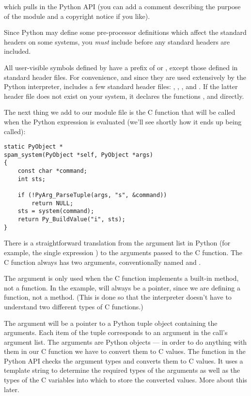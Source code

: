 which pulls in the Python API (you can add a comment describing the
purpose of the module and a copyright notice if you like).

\begin{notice}[warning]
  Since Python may define some pre-processor definitions which affect
  the standard headers on some systems, you \emph{must} include
   before any standard headers are included.
\end{notice}

All user-visible symbols defined by  have a prefix of
 or , except those defined in standard header files.
For convenience, and since they are used extensively by the Python
interpreter,  includes a few standard header files:
, , , and
.  If the latter header file does not exist on your
system, it declares the functions ,
 and  directly.

The next thing we add to our module file is the C function that will
be called when the Python expression 
is evaluated (we'll see shortly how it ends up being called):

\begin{verbatim}
static PyObject *
spam_system(PyObject *self, PyObject *args)
{
    const char *command;
    int sts;

    if (!PyArg_ParseTuple(args, "s", &command))
        return NULL;
    sts = system(command);
    return Py_BuildValue("i", sts);
}
\end{verbatim}

There is a straightforward translation from the argument list in
Python (for example, the single expression ) to the
arguments passed to the C function.  The C function always has two
arguments, conventionally named  and .

The  argument is only used when the C function implements a
built-in method, not a function. In the example,  will
always be a \NULL{} pointer, since we are defining a function, not a
method.  (This is done so that the interpreter doesn't have to
understand two different types of C functions.)

The  argument will be a pointer to a Python tuple object
containing the arguments.  Each item of the tuple corresponds to an
argument in the call's argument list.  The arguments are Python
objects --- in order to do anything with them in our C function we have
to convert them to C values.  The function 
in the Python API checks the argument types and converts them to C
values.  It uses a template string to determine the required types of
the arguments as well as the types of the C variables into which to
store the converted values.  More about this later.


